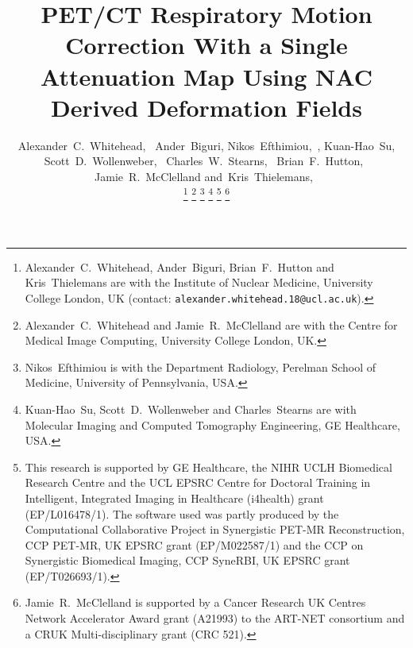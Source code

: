 \documentclass[10pt, twocolumn, twoside, letterpaper]{IEEEtran}
\begin{document}
\title{PET/CT Respiratory Motion Correction With a Single Attenuation Map Using NAC Derived Deformation Fields}

\pagestyle{plain}

\author{Alexander~C.~Whitehead,~
        Ander~Biguri,
        Nikos~Efthimiou,~,
        Kuan-Hao~Su,
        Scott~D.~Wollenweber,~
        Charles~W.~Stearns,~
        Brian~F.~Hutton,~
        Jamie~R.~McClelland
        and~Kris~Thielemans,~%
        

    \thanks{Alexander~C.~Whitehead, Ander~Biguri, Brian~F.~Hutton and Kris~Thielemans are with the Institute of Nuclear Medicine, University College London, UK (contact: \texttt{alexander.whitehead.18@ucl.ac.uk}).}%
    \thanks{Alexander~C.~Whitehead and Jamie~R.~McClelland are with the Centre for Medical Image Computing, University College London, UK.}%
    \thanks{Nikos~Efthimiou is with the Department Radiology, Perelman School of Medicine, University of Pennsylvania, USA.}%
    \thanks{Kuan-Hao~Su, Scott~D.~Wollenweber and Charles~Stearns are with Molecular Imaging and Computed Tomography Engineering, GE Healthcare, USA.}%
    \thanks{This research is supported by GE Healthcare, the NIHR UCLH Biomedical Research Centre and the UCL EPSRC Centre for Doctoral Training in Intelligent, Integrated Imaging in Healthcare (i4health) grant (EP/L016478/1). The software used was partly produced by the Computational Collaborative Project in Synergistic PET-MR Reconstruction, CCP PET-MR, UK EPSRC grant (EP/M022587/1) and the CCP on Synergistic Biomedical Imaging, CCP SyneRBI, UK EPSRC grant (EP/T026693/1).}%
    \thanks{Jamie~R.~McClelland is supported by a Cancer Research UK Centres Network Accelerator Award grant (A21993) to the ART-NET consortium and a CRUK Multi-disciplinary grant (CRC 521).}%
}

\maketitle
\IEEEpeerreviewmaketitle
\end{document}
